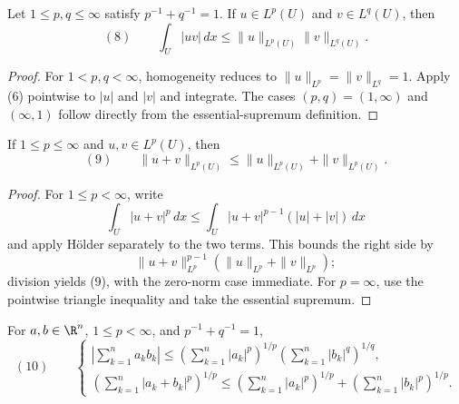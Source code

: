 \begin{lemma}
\label{lem:holders-inequality}

Let $1\leq p,q\leq\infty$ satisfy $p^{-1}+q^{-1}=1$. If $u\in L^p(U)$ and $v\in L^q(U)$, then
\[
(8)\qquad
\int_U|uv|\,dx
\leq\|u\|_{L^p(U)}\|v\|_{L^q(U)}.
\]
\end{lemma}
\begin{proof}
\sketch For $1<p,q<\infty$, homogeneity reduces to $\|u\|_{L^p}=\|v\|_{L^q}=1$. Apply (6) pointwise to $|u|$ and $|v|$ and integrate. The cases $(p,q)=(1,\infty)$ and $(\infty,1)$ follow directly from the essential-supremum definition.
\end{proof}

\begin{lemma}
\label{lem:minkowskis-inequality}

If $1\leq p\leq\infty$ and $u,v\in L^p(U)$, then
\[
(9)\qquad
\|u+v\|_{L^p(U)}
\leq\|u\|_{L^p(U)}+\|v\|_{L^p(U)}.
\]
\end{lemma}
\begin{proof}
\sketch For $1\leq p<\infty$, write
\[
\int_U|u+v|^p\,dx
\leq\int_U|u+v|^{p-1}(|u|+|v|)\,dx
\]
and apply H\"older separately to the two terms. This bounds the right side by
\[
\|u+v\|_{L^p}^{p-1}
(\|u\|_{L^p}+\|v\|_{L^p});
\]
division yields (9), with the zero-norm case immediate. For $p=\infty$, use the pointwise triangle inequality and take the essential supremum.
\end{proof}

\begin{remark}
\label{rem:discrete-holder-minkowski-inequalities}

For $a,b\in\R^n$, $1\leq p<\infty$, and $p^{-1}+q^{-1}=1$,
\[
(10)\qquad
\begin{cases}
\displaystyle
\left|\sum_{k=1}^na_kb_k\right|
\leq
\left(\sum_{k=1}^n|a_k|^p\right)^{1/p}
\left(\sum_{k=1}^n|b_k|^q\right)^{1/q},\\[1em]
\displaystyle
\left(\sum_{k=1}^n|a_k+b_k|^p\right)^{1/p}
\leq
\left(\sum_{k=1}^n|a_k|^p\right)^{1/p}
+\left(\sum_{k=1}^n|b_k|^p\right)^{1/p}.
\end{cases}
\]
\end{remark}

